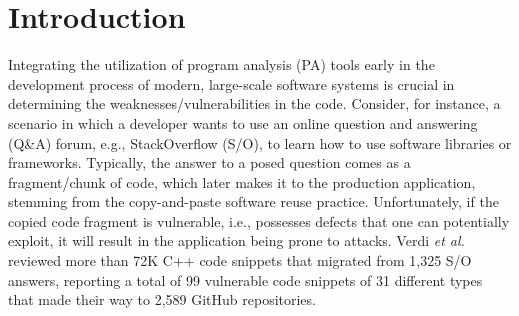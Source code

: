 \section{Introduction}

Integrating the utilization of program analysis (PA) tools early in the development process of modern, large-scale software systems is crucial in determining the weaknesses/vulnerabilities in the code. Consider, for instance, a scenario in which a developer wants to use an online question and answering (Q\&A) forum, e.g., StackOverflow (S/O), to learn how to use software libraries or frameworks. Typically, the answer to a posed question comes as a fragment/chunk of code, which later makes it to the production application, stemming from the copy-and-paste software reuse practice. Unfortunately, if the copied code fragment is vulnerable, i.e., possesses defects that one can potentially exploit, it will result in the application being prone to attacks. Verdi {\em et al.}~\cite{verdi-tse22} reviewed more than 72K C++ code snippets that migrated from 1,325 S/O answers, reporting a total of 99 vulnerable code snippets of 31 different types that made their way to 2,589 GitHub repositories.

